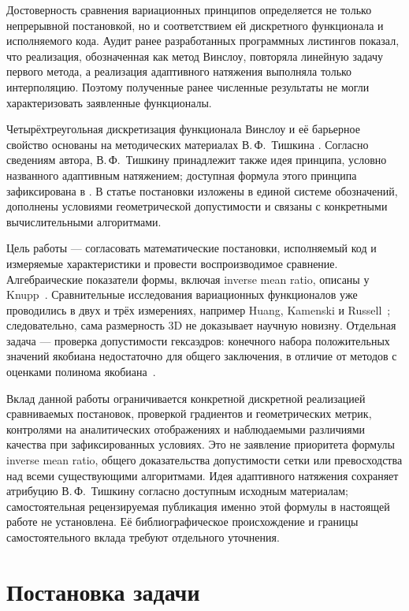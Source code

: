 \documentclass[11pt,a4paper]{article}
\begin{document}
Достоверность сравнения вариационных принципов определяется не только
непрерывной постановкой, но и соответствием ей дискретного функционала и
исполняемого кода. Аудит ранее разработанных программных листингов
\cite{khalilov2024} показал, что реализация, обозначенная как метод
Винслоу, повторяла линейную задачу первого метода, а реализация
адаптивного натяжения выполняла только интерполяцию. Поэтому полученные
ранее численные результаты не могли характеризовать заявленные
функционалы.

Четырёхтреугольная дискретизация функционала Винслоу и её барьерное
свойство основаны на методических материалах В.\,Ф.~Тишкина
\cite{tishkin2024}. Согласно сведениям автора, В.\,Ф.~Тишкину
принадлежит также идея принципа, условно названного адаптивным
натяжением; доступная формула этого принципа зафиксирована в
\cite{khalilov2024}. В статье постановки изложены в единой системе
обозначений, дополнены условиями геометрической допустимости и связаны
с конкретными вычислительными алгоритмами.

Цель работы --- согласовать математические постановки, исполняемый код и
измеряемые характеристики и провести воспроизводимое сравнение.
Алгебраические показатели формы, включая inverse mean ratio, описаны
у Knupp~\cite{knupp2001}. Сравнительные исследования вариационных
функционалов уже проводились в двух и трёх измерениях, например
Huang, Kamenski и Russell~\cite{huang2015}; следовательно, сама размерность
3D не доказывает научную новизну.
Отдельная задача --- проверка допустимости гексаэдров: конечного набора
положительных значений якобиана недостаточно для общего заключения,
в отличие от методов с оценками полинома якобиана~\cite{johnen2017}.

Вклад данной работы ограничивается конкретной дискретной реализацией
сравниваемых постановок, проверкой градиентов и геометрических метрик,
контролями на аналитических отображениях и наблюдаемыми различиями
качества при зафиксированных условиях. Это не заявление приоритета
формулы inverse mean ratio, общего доказательства допустимости сетки
или превосходства над всеми существующими алгоритмами.
Идея адаптивного натяжения сохраняет атрибуцию В.\,Ф.~Тишкину согласно
доступным исходным материалам; самостоятельная рецензируемая публикация
именно этой формулы в настоящей работе не установлена. Её библиографическое
происхождение и границы самостоятельного вклада требуют отдельного уточнения.

\section{Постановка задачи}
\end{document}
